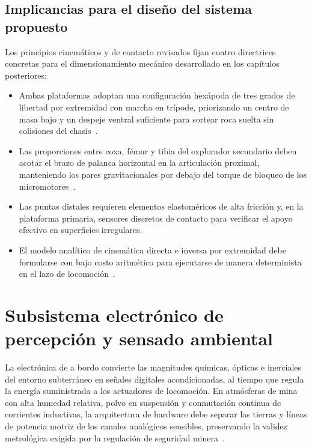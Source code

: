 \subsection{Implicancias para el diseño del sistema propuesto}

Los principios cinemáticos y de contacto revisados fijan cuatro directrices concretas para el dimensionamiento mecánico desarrollado en los capítulos posteriores:

\begin{itemize}
    \item Ambas plataformas adoptan una configuración hexápoda de tres grados de libertad por extremidad con marcha en trípode, priorizando un centro de masa bajo y un despeje ventral suficiente para sortear roca suelta sin colisiones del chasis~\cite{Sensors2021_HexapodReview, Wu2024_SpiderLegDesign}.
    \item Las proporciones entre coxa, fémur y tibia del explorador secundario deben acotar el brazo de palanca horizontal en la articulación proximal, manteniendo los pares gravitacionales por debajo del torque de bloqueo de los micromotores~\cite{James2021_InsectLegDesign, Wang2022_Energies_Hexapod}.
    \item Las puntas distales requieren elementos elastoméricos de alta fricción y, en la plataforma primaria, sensores discretos de contacto para verificar el apoyo efectivo en superficies irregulares.
    \item El modelo analítico de cinemática directa e inversa por extremidad debe formularse con bajo costo aritmético para ejecutarse de manera determinista en el lazo de locomoción~\cite{craig2005introduction, PutraWidodo2023_Hexapod}.
\end{itemize}


\section{Subsistema electrónico de percepción y sensado ambiental}
\label{sec:subsistema_electronico}

La electrónica de a bordo convierte las magnitudes químicas, ópticas e inerciales del entorno subterráneo en señales digitales acondicionadas, al tiempo que regula la energía suministrada a los actuadores de locomoción. En atmósferas de mina con alta humedad relativa, polvo en suspensión y conmutación continua de corrientes inductivas, la arquitectura de hardware debe separar las tierras y líneas de potencia motriz de los canales analógicos sensibles, preservando la validez metrológica exigida por la regulación de seguridad minera~\cite{MINEM_DS024_2016, OSINERGMIN_BoletinGSM_Ventilacion_2020, TorresSalazar2021_Diesel}.

